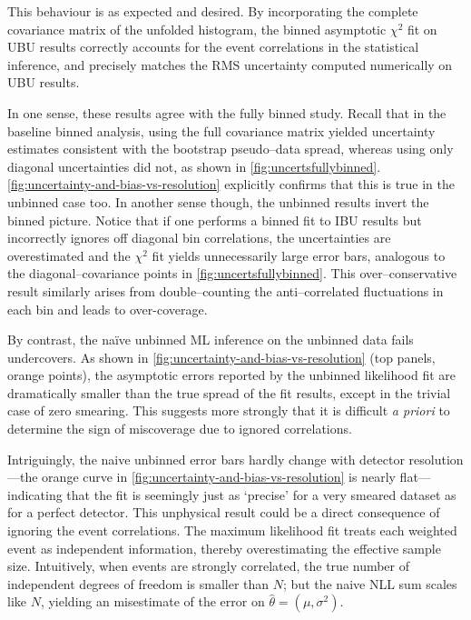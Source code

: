             This behaviour is as expected and desired.
            By incorporating the complete covariance matrix of the unfolded histogram, the binned asymptotic \(\chi^2\) fit on UBU results correctly accounts for the event correlations in the statistical inference, and precisely matches the RMS uncertainty computed numerically on UBU results.
            
            In one sense, these results agree with the fully binned study.
            Recall that in the baseline binned analysis, using the full covariance matrix yielded uncertainty estimates consistent with the bootstrap pseudo--data spread, whereas using only diagonal uncertainties did not, as shown in \cref{fig:uncertsfullybinned}.
            \cref{fig:uncertainty-and-bias-vs-resolution} explicitly confirms that this is true in the unbinned case too.
            In another sense though, the unbinned results invert the binned picture.
            Notice that if one performs a binned fit to IBU results but incorrectly ignores off diagonal bin correlations, the uncertainties are overestimated and the $\chi^2$ fit yields unnecessarily large error bars, analogous to the diagonal--covariance points in \cref{fig:uncertsfullybinned}.
            This over--conservative result similarly arises from double--counting the anti--correlated fluctuations in each bin and leads to over-coverage.
    
            By contrast, the na\"ive unbinned ML inference on the unbinned data fails undercovers.
            As shown in \cref{fig:uncertainty-and-bias-vs-resolution} (top panels, orange points), the asymptotic errors reported by the unbinned likelihood fit are dramatically smaller than the true spread of the fit results, except in the trivial case of zero smearing.
            This suggests more strongly that it is difficult \textit{a priori} to determine the sign of miscoverage due to ignored correlations.
            
            Intriguingly, the naive unbinned error bars hardly change with detector resolution---the orange curve in \cref{fig:uncertainty-and-bias-vs-resolution} is nearly flat---indicating that the fit is seemingly just as `precise' for a very smeared dataset as for a perfect detector.
            This unphysical result could be a direct consequence of ignoring the event correlations.
            The maximum likelihood fit treats each weighted event as independent information, thereby overestimating the effective sample size.
            Intuitively, when events are strongly correlated, the true number of independent degrees of freedom is smaller than $N$; but the naive NLL sum scales like $N$, yielding an misestimate of the error on $\hat\theta = (\mu, \sigma^2)$.
            
